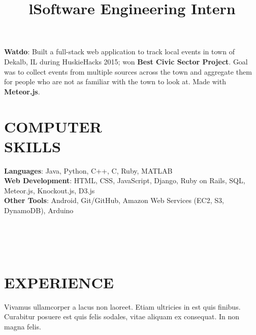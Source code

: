 \documentclass[margin]{res}
\begin{document}
\begin{resume}
\par
\textbf{Watdo}:
Built a full-stack web application to track local events in town of Dekalb, IL during
HuskieHacks 2015; won \textbf{Best Civic Sector Project}. Goal was to collect events
from multiple sources across the town and aggregate them for people who are not as familiar
with the town to look at. Made with \textbf{Meteor.js}.


\section{COMPUTER\\SKILLS}

\textbf{Languages}: Java, Python, C++, C, Ruby, MATLAB
\\
\textbf{Web Development}: HTML, CSS, JavaScript, Django, Ruby on Rails, SQL,
                          Meteor.js, Knockout.js, D3.js
\\
\textbf{Other Tools}: Android, Git/GitHub, Amazon Web Services (EC2, S3, DynamoDB), Arduino

\begin{format}
\title{l}\\
\\
\body\\
\end{format}

\section{EXPERIENCE}
\title{\textbf{Software Engineering Intern}}
\begin{position}
Vivamus ullamcorper a lacus non laoreet. Etiam ultricies in est quis finibus.
Curabitur posuere est quis felis sodales, vitae aliquam ex consequat. In non
magna felis.
\end{position}


\end{resume}
\end{document}
